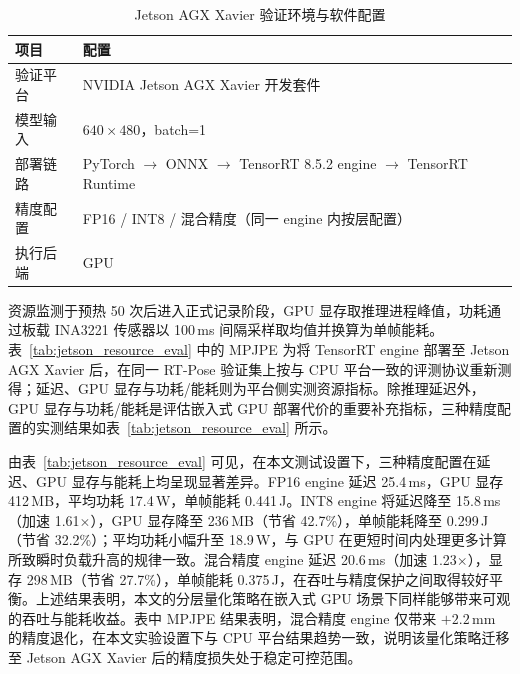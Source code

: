 \begin{table}[htbp]
  \centering
  \small
\caption{Jetson AGX Xavier 验证环境与软件配置}
  \label{tab:jetson_env}
  \begin{tabular}{>{\centering\arraybackslash}p{} >{\centering\arraybackslash}p{}}
    \toprule
    项目 & 配置 \\
    \midrule
    验证平台   & NVIDIA Jetson AGX Xavier 开发套件 \\
    模型输入   & $640\times480$，batch=1 \\
    部署链路   & PyTorch $\rightarrow$ ONNX $\rightarrow$ TensorRT 8.5.2 engine $\rightarrow$ TensorRT Runtime \\
    精度配置   & FP16 / INT8 / 混合精度（同一 engine 内按层配置） \\
    执行后端   & GPU \\
    \bottomrule
  \end{tabular}
\end{table}

资源监测于预热 50 次后进入正式记录阶段，GPU 显存取推理进程峰值，功耗通过板载 INA3221 传感器以 100\,ms 间隔采样取均值并换算为单帧能耗。表~\ref{tab:jetson_resource_eval} 中的 MPJPE 为将 TensorRT engine 部署至 Jetson AGX Xavier 后，在同一 RT-Pose 验证集上按与 CPU 平台一致的评测协议重新测得；延迟、GPU 显存与功耗/能耗则为平台侧实测资源指标。除推理延迟外，GPU 显存与功耗/能耗是评估嵌入式 GPU 部署代价的重要补充指标，三种精度配置的实测结果如表~\ref{tab:jetson_resource_eval} 所示。

\begin{table}[htbp]
  \centering
  \small
\caption{Jetson AGX Xavier 平台资源开销评估}
  \label{tab:jetson_resource_eval}
\end{table}

由表~\ref{tab:jetson_resource_eval} 可见，在本文测试设置下，三种精度配置在延迟、GPU 显存与能耗上均呈现显著差异。FP16 engine 延迟 25.4\,ms，GPU 显存 412\,MB，平均功耗 17.4\,W，单帧能耗 0.441\,J。INT8 engine 将延迟降至 15.8\,ms（加速 1.61$\times$），GPU 显存降至 236\,MB（节省 42.7\%），单帧能耗降至 0.299\,J（节省 32.2\%）；平均功耗小幅升至 18.9\,W，与 GPU 在更短时间内处理更多计算所致瞬时负载升高的规律一致。混合精度 engine 延迟 20.6\,ms（加速 1.23$\times$），显存 298\,MB（节省 27.7\%），单帧能耗 0.375\,J，在吞吐与精度保护之间取得较好平衡。上述结果表明，本文的分层量化策略在嵌入式 GPU 场景下同样能够带来可观的吞吐与能耗收益。表中 MPJPE 结果表明，混合精度 engine 仅带来 $+2.2\,\text{mm}$ 的精度退化，在本文实验设置下与 CPU 平台结果趋势一致，说明该量化策略迁移至 Jetson AGX Xavier 后的精度损失处于稳定可控范围。

